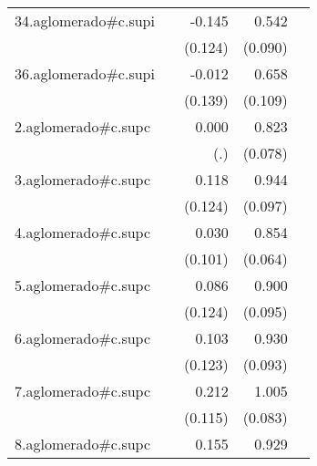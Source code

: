 {\begin{longtable}{l*{4}{D{.}{.}{-1}}}
\addlinespace
34.aglomerado#c.supi&                     &      -0.145         &       0.542\sym{***}&                     \\
            &                     &     (0.124)         &     (0.090)         &                     \\
\addlinespace
36.aglomerado#c.supi&                     &      -0.012         &       0.658\sym{***}&                     \\
            &                     &     (0.139)         &     (0.109)         &                     \\
\addlinespace
2.aglomerado#c.supc&                     &       0.000         &       0.823\sym{***}&                     \\
            &                     &         (.)         &     (0.078)         &                     \\
\addlinespace
3.aglomerado#c.supc&                     &       0.118         &       0.944\sym{***}&                     \\
            &                     &     (0.124)         &     (0.097)         &                     \\
\addlinespace
4.aglomerado#c.supc&                     &       0.030         &       0.854\sym{***}&                     \\
            &                     &     (0.101)         &     (0.064)         &                     \\
\addlinespace
5.aglomerado#c.supc&                     &       0.086         &       0.900\sym{***}&                     \\
            &                     &     (0.124)         &     (0.095)         &                     \\
\addlinespace
6.aglomerado#c.supc&                     &       0.103         &       0.930\sym{***}&                     \\
            &                     &     (0.123)         &     (0.093)         &                     \\
\addlinespace
7.aglomerado#c.supc&                     &       0.212         &       1.005\sym{***}&                     \\
            &                     &     (0.115)         &     (0.083)         &                     \\
\addlinespace
8.aglomerado#c.supc&                     &       0.155         &       0.929\sym{***}&                     \\

\end{longtable}}
